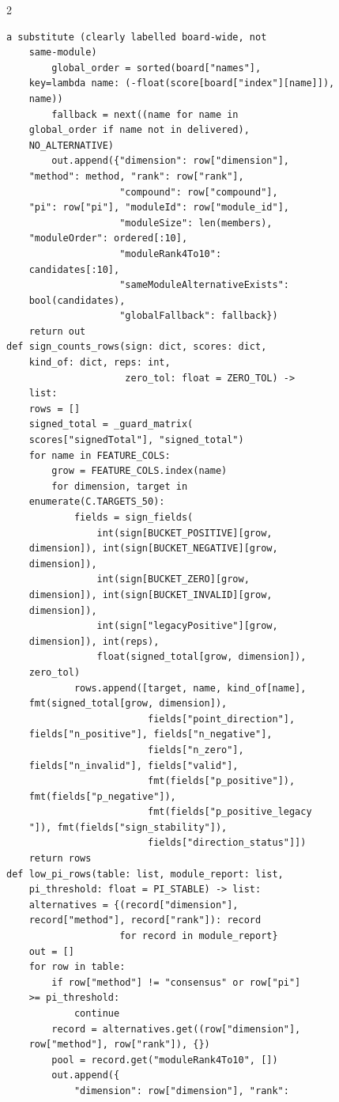 \begin{multicols}{2}
\begin{Verbatim}[fontsize=\scriptsize]
    a substitute (clearly labelled board-wide, not
    same-module)
        global_order = sorted(board["names"],
    key=lambda name: (-float(score[board["index"][name]]),
    name))
        fallback = next((name for name in
    global_order if name not in delivered),
    NO_ALTERNATIVE)
        out.append({"dimension": row["dimension"],
    "method": method, "rank": row["rank"],
                    "compound": row["compound"],
    "pi": row["pi"], "moduleId": row["module_id"],
                    "moduleSize": len(members),
    "moduleOrder": ordered[:10],
                    "moduleRank4To10":
    candidates[:10],
                    "sameModuleAlternativeExists":
    bool(candidates),
                    "globalFallback": fallback})
    return out
def sign_counts_rows(sign: dict, scores: dict,
    kind_of: dict, reps: int,
                     zero_tol: float = ZERO_TOL) ->
    list:
    rows = []
    signed_total = _guard_matrix(
    scores["signedTotal"], "signed_total")
    for name in FEATURE_COLS:
        grow = FEATURE_COLS.index(name)
        for dimension, target in
    enumerate(C.TARGETS_50):
            fields = sign_fields(
                int(sign[BUCKET_POSITIVE][grow,
    dimension]), int(sign[BUCKET_NEGATIVE][grow,
    dimension]),
                int(sign[BUCKET_ZERO][grow,
    dimension]), int(sign[BUCKET_INVALID][grow,
    dimension]),
                int(sign["legacyPositive"][grow,
    dimension]), int(reps),
                float(signed_total[grow, dimension]),
    zero_tol)
            rows.append([target, name, kind_of[name],
    fmt(signed_total[grow, dimension]),
                         fields["point_direction"],
    fields["n_positive"], fields["n_negative"],
                         fields["n_zero"],
    fields["n_invalid"], fields["valid"],
                         fmt(fields["p_positive"]),
    fmt(fields["p_negative"]),
                         fmt(fields["p_positive_legacy
    "]), fmt(fields["sign_stability"]),
                         fields["direction_status"]])
    return rows
def low_pi_rows(table: list, module_report: list,
    pi_threshold: float = PI_STABLE) -> list:
    alternatives = {(record["dimension"],
    record["method"], record["rank"]): record
                    for record in module_report}
    out = []
    for row in table:
        if row["method"] != "consensus" or row["pi"]
    >= pi_threshold:
            continue
        record = alternatives.get((row["dimension"],
    row["method"], row["rank"]), {})
        pool = record.get("moduleRank4To10", [])
        out.append({
            "dimension": row["dimension"], "rank":

\end{Verbatim}
\end{multicols}
